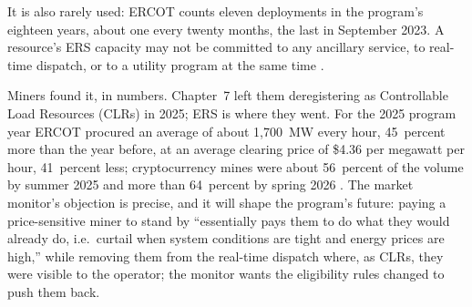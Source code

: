It is also rarely used: ERCOT counts eleven deployments in the program's eighteen years, about one every twenty months, the last in September 2023. A resource's ERS capacity may not be committed to any ancillary service, to real-time dispatch, or to a utility program at the same time \autocite{ercotgridinsightsdr2025,ercot2026protocols}. %

Miners found it, in numbers. Chapter~7 left them deregistering as Controllable Load Resources (CLRs) in 2025; ERS is where they went. For the 2025 program year ERCOT procured an average of about 1,700~MW every hour, 45~percent more than the year before, at an average clearing price of \$4.36 per megawatt per hour, 41~percent less; cryptocurrency mines were about 56~percent of the volume by summer 2025 and more than 64~percent by spring 2026 \autocite{potomac2026somercot}. %
The market monitor's objection is precise, and it will shape the program's future: paying a price-sensitive miner to stand by ``essentially pays them to do what they would already do, i.e.\ curtail when system conditions are tight and energy prices are high,'' while removing them from the real-time dispatch where, as CLRs, they were visible to the operator; the monitor wants the eligibility rules changed to push them back. %

